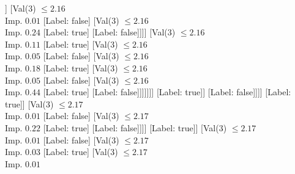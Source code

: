 \documentclass[margin=10pt]{standalone}
\begin{document}
\begin{forest}
																										[Val($3$) $ \leq 2.16$ \\ Imp. $0.01$
																											[Val($3$) $ \leq 2.16$ \\ Imp. $0.05$
																												[Val($3$) $ \leq 2.16$ \\ Imp. $0.01$
																													[Val($3$) $ \leq 2.16$ \\ Imp. $0.02$
																														[Val($3$) $ \leq 2.16$ \\ Imp. $0.44$
																															[Label: false]
																															[Label: true]]
																														[Val($3$) $ \leq 2.16$ \\ Imp. $0.01$
																															[Label: false]
																															[Val($3$) $ \leq 2.16$ \\ Imp. $0.24$
																																[Label: true]
																																[Label: false]]]]
																													[Val($3$) $ \leq 2.16$ \\ Imp. $0.11$
																														[Label: true]
																														[Val($3$) $ \leq 2.16$ \\ Imp. $0.05$
																															[Label: false]
																															[Val($3$) $ \leq 2.16$ \\ Imp. $0.18$
																																[Label: true]
																																[Val($3$) $ \leq 2.16$ \\ Imp. $0.05$
																																	[Label: false]
																																	[Val($3$) $ \leq 2.16$ \\ Imp. $0.44$
																																		[Label: true]
																																		[Label: false]]]]]]]
																												[Label: true]]
																											[Label: false]]]]
																								[Label: true]]
																							[Val($3$) $ \leq 2.17$ \\ Imp. $0.01$
																								[Label: false]
																								[Val($3$) $ \leq 2.17$ \\ Imp. $0.22$
																									[Label: true]
																									[Label: false]]]]
																						[Label: true]]
																					[Val($3$) $ \leq 2.17$ \\ Imp. $0.01$
																						[Label: false]
																						[Val($3$) $ \leq 2.17$ \\ Imp. $0.03$
																							[Label: true]
																							[Val($3$) $ \leq 2.17$ \\ Imp. $0.01$

\end{forest}
\end{document}
